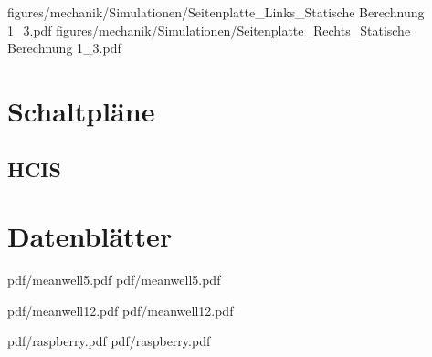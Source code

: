
 {figures/mechanik/Simulationen/Seitenplatte_Links_Statische Berechnung 1_3.pdf}
 {figures/mechanik/Simulationen/Seitenplatte_Rechts_Statische Berechnung 1_3.pdf}

\chapter{Schaltpläne}


\newpage

\section{HCIS}




\chapter{Datenblätter}



 {pdf/meanwell5.pdf}
 {pdf/meanwell5.pdf}


 {pdf/meanwell12.pdf}
 {pdf/meanwell12.pdf}

 {pdf/raspberry.pdf}
 {pdf/raspberry.pdf}


